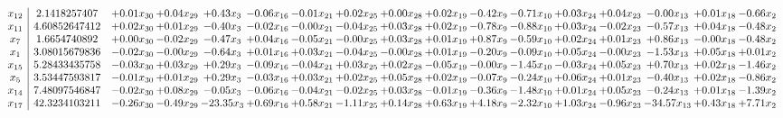 \documentclass[9pt]{article}
\begin{document}
 \[\begin{array}{c| c c@{\hskip 2pt} c@{\hskip 2pt} c@{\hskip 2pt} c@{\hskip 2pt} c@{\hskip 2pt} c@{\hskip 2pt} c@{\hskip 2pt} c@{\hskip 2pt} c@{\hskip 2pt} c@{\hskip 2pt} c@{\hskip 2pt} c@{\hskip 2pt} c@{\hskip 2pt} c@{\hskip 2pt} c@{\hskip 2pt} }
 x_{12}   &  2.1418257407 & +  0.01 x_{30} & +  0.04 x_{29} & +  0.43 x_{3} & -0.06 x_{16} & -0.01 x_{21} & +  0.02 x_{25} & +  0.00 x_{28} & +  0.02 x_{19} & -0.42 x_{9} & -0.71 x_{10} & +  0.03 x_{24} & +  0.04 x_{23} & -0.00 x_{13} & +  0.01 x_{18} & -0.66 x_{2}\\
 x_{11}   &  4.60852647412 & +  0.02 x_{30} & +  0.01 x_{29} & -0.40 x_{3} & -0.02 x_{16} & -0.00 x_{21} & -0.04 x_{25} & +  0.03 x_{28} & +  0.02 x_{19} & -0.78 x_{9} & -0.88 x_{10} & +  0.03 x_{24} & -0.02 x_{23} & -0.57 x_{13} & +  0.04 x_{18} & -0.48 x_{2}\\
 x_{7}   &  1.6654740892 & +  0.00 x_{30} & -0.02 x_{29} & -0.47 x_{3} & +  0.04 x_{16} & -0.05 x_{21} & -0.00 x_{25} & +  0.03 x_{28} & +  0.01 x_{19} & +  0.87 x_{9} & -0.59 x_{10} & +  0.02 x_{24} & +  0.01 x_{23} & +  0.86 x_{13} & -0.00 x_{18} & -0.48 x_{2}\\
 x_{1}   &  3.08015679836 & -0.02 x_{30} & -0.00 x_{29} & -0.64 x_{3} & +  0.01 x_{16} & +  0.03 x_{21} & -0.04 x_{25} & -0.00 x_{28} & +  0.01 x_{19} & -0.20 x_{9} & -0.09 x_{10} & +  0.05 x_{24} & -0.00 x_{23} & -1.53 x_{13} & +  0.05 x_{18} & +  0.01 x_{2}\\
 x_{15}   &  5.28433435758 & -0.03 x_{30} & +  0.03 x_{29} & +  0.29 x_{3} & -0.09 x_{16} & -0.04 x_{21} & +  0.03 x_{25} & +  0.02 x_{28} & -0.05 x_{19} & -0.00 x_{9} & -1.45 x_{10} & -0.03 x_{24} & +  0.05 x_{23} & +  0.70 x_{13} & +  0.02 x_{18} & -1.46 x_{2}\\
 x_{5}   &  3.53447593817 & -0.01 x_{30} & +  0.01 x_{29} & +  0.29 x_{3} & -0.03 x_{16} & +  0.03 x_{21} & +  0.02 x_{25} & +  0.05 x_{28} & +  0.02 x_{19} & -0.07 x_{9} & -0.24 x_{10} & +  0.06 x_{24} & +  0.01 x_{23} & -0.40 x_{13} & +  0.02 x_{18} & -0.86 x_{2}\\
 x_{14}   &  7.48097546847 & -0.02 x_{30} & +  0.08 x_{29} & -0.05 x_{3} & -0.06 x_{16} & -0.04 x_{21} & -0.02 x_{25} & +  0.03 x_{28} & -0.01 x_{19} & -0.36 x_{9} & -1.48 x_{10} & +  0.01 x_{24} & +  0.05 x_{23} & -0.24 x_{13} & +  0.01 x_{18} & -1.39 x_{2}\\
 x_{17}   &  42.3234103211 & -0.26 x_{30} & -0.49 x_{29} & -23.35 x_{3} & +  0.69 x_{16} & +  0.58 x_{21} & -1.11 x_{25} & +  0.14 x_{28} & +  0.63 x_{19} & +  4.18 x_{9} & -2.32 x_{10} & +  1.03 x_{24} & -0.96 x_{23} & -34.57 x_{13} & +  0.43 x_{18} & +  7.71 x_{2}\\

\end{array}\]
\end{document}

